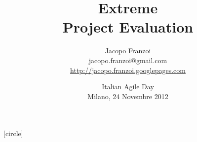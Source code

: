 \usepackage[italian]{babel}
\usepackage[utf8]{inputenc}
\usepackage{kmath,kerkis}
\usepackage[T1]{fontenc}
\usepackage{color}
\usepackage{hyperref}
\usepackage[absolute, overlay]{textpos}


[circle]

\newcommand{\highlight}[1]{{\color{purple} \emph{#1}}}

\title{ Extreme \\ Project Evaluation }

\author{
	Jacopo Franzoi \\
	{\scriptsize jacopo.franzoi@gmail.com } \\
	{\scriptsize \href{http://jacopo.franzoi.googlepages.com/}{http://jacopo.franzoi.googlepages.com} \\ }
}

\date{
	Italian Agile Day \\
	Milano, 24 Novembre 2012
}


	
	\begin{frame}
		\titlepage
		
	\end{frame}	

